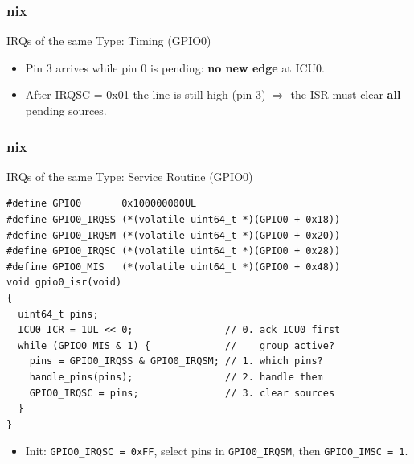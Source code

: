 \documentclass{beamer}
\newcommand{\astitle}{nix}
\newcommand{\assubtitle}{nix}
\newcommand{\cmd}[1]{\texttt{#1}}
\newcommand{\wlabel}[2]{\node[anchor=east,font=\tiny] at (0,#1+0.2) {#2};}
\newcommand{\wgrid}[1]{\foreach \t in {0,...,#1} \draw[very thin,lightgray] (\t,-0.2) -- (\t,6.2);}
\begin{document}
\renewcommand{\assubtitle}{IRQs of the same Type: Timing (GPIO0)}
\begin{frame}
\frametitle{\astitle}
\begin{block}{\assubtitle}
\centering
{}
\end{block}
  \begin{itemize}
    \item Pin 3 arrives while pin 0 is pending: \textbf{no new edge} at ICU0.
    \item After IRQSC = 0x01 the line is still high (pin 3) $\Rightarrow$
      the ISR must clear \textbf{all} pending sources.
  \end{itemize}
\end{frame}

\renewcommand{\assubtitle}{IRQs of the same Type: Service Routine (GPIO0)}
\begin{frame}[fragile]
\frametitle{\astitle}
\begin{block}{\assubtitle}
\begin{lstlisting}[style=c]
#define GPIO0       0x100000000UL
#define GPIO0_IRQSS (*(volatile uint64_t *)(GPIO0 + 0x18))
#define GPIO0_IRQSM (*(volatile uint64_t *)(GPIO0 + 0x20))
#define GPIO0_IRQSC (*(volatile uint64_t *)(GPIO0 + 0x28))
#define GPIO0_MIS   (*(volatile uint64_t *)(GPIO0 + 0x48))
void gpio0_isr(void)
{
  uint64_t pins;
  ICU0_ICR = 1UL << 0;                // 0. ack ICU0 first
  while (GPIO0_MIS & 1) {             //    group active?
    pins = GPIO0_IRQSS & GPIO0_IRQSM; // 1. which pins?
    handle_pins(pins);                // 2. handle them
    GPIO0_IRQSC = pins;               // 3. clear sources
  }
}
\end{lstlisting}
\end{block}
  \begin{itemize}
    \item Init: \cmd{GPIO0\_IRQSC = 0xFF}, select pins in \cmd{GPIO0\_IRQSM},
      then \cmd{GPIO0\_IMSC = 1}.
  \end{itemize}
\end{frame}
\end{document}

